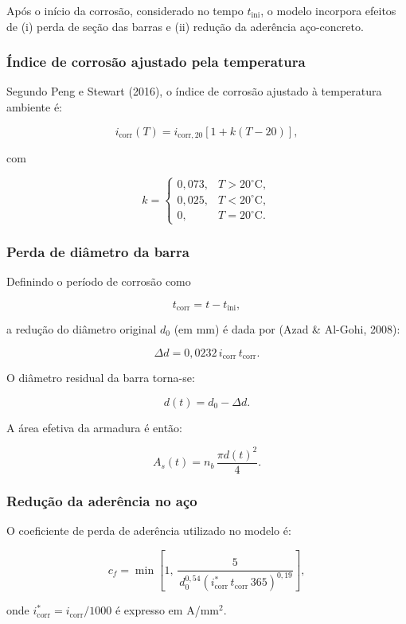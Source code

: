 Após o início da corrosão, considerado no tempo $t_{\mathrm{ini}}$, o modelo incorpora efeitos de (i) perda de seção das barras e (ii) redução da aderência aço-concreto.

\subsubsection{Índice de corrosão ajustado pela temperatura}

Segundo Peng e Stewart (2016), o índice de corrosão ajustado à temperatura ambiente é:

\[
i_{\mathrm{corr}}(T) = i_{\mathrm{corr},20} \left[ 1 + k(T - 20) \right],
\]

com

\[
k =
\begin{cases}
0{,}073, & T > 20^\circ\text{C}, \\
0{,}025, & T < 20^\circ\text{C}, \\
0, & T = 20^\circ\text{C}.
\end{cases}
\]

\subsubsection{Perda de diâmetro da barra}

Definindo o período de corrosão como

\[
t_{\mathrm{corr}} = t - t_{\mathrm{ini}},
\]

a redução do diâmetro original $d_0$ (em mm) é dada por (Azad \& Al-Gohi, 2008):

\[
\Delta d = 0{,}0232 \, i_{\mathrm{corr}} \, t_{\mathrm{corr}}.
\]

O diâmetro residual da barra torna-se:

\[
d(t) = d_0 - \Delta d.
\]

A área efetiva da armadura é então:

\[
A_s(t) = n_b \, \frac{\pi d(t)^2}{4}.
\]

\subsubsection{Redução da aderência no aço}

O coeficiente de perda de aderência utilizado no modelo é:

\[
c_f =
\min\left[
1,\,
\dfrac{5}{\, d_0^{0{,}54} \left( i_{\mathrm{corr}}^\ast \, t_{\mathrm{corr}} \, 365 \right)^{0{,}19}}
\right],
\]

onde $i_{\mathrm{corr}}^\ast = i_{\mathrm{corr}}/1000$ é expresso em A/mm\(^2\).

